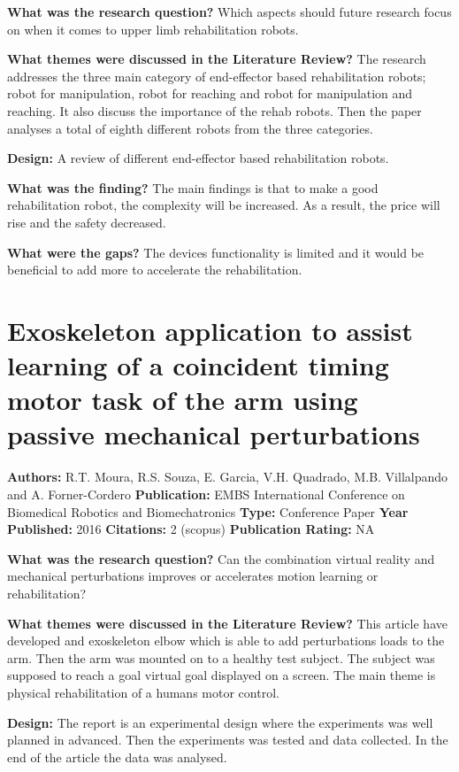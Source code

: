 \textbf{What was the research question?}
Which aspects should future research focus on when it comes to upper limb rehabilitation robots.

\textbf{What themes were discussed in the Literature Review?}  
The research addresses the three main category of end-effector based rehabilitation robots; robot for manipulation, robot for reaching and robot for manipulation and reaching. It also discuss the importance of the rehab robots. Then the paper analyses a total of eighth different robots from the three categories. 

\textbf{Design:}  
A review of different end-effector based rehabilitation robots. 

\textbf{What was the finding?} 
The main findings is that to make a good rehabilitation robot, the complexity will be increased. As a result, the price will rise and the safety decreased. 

\textbf{What were the gaps?}   
The devices functionality is limited and it would be beneficial to add more to accelerate the rehabilitation. 



\section{Exoskeleton application to assist learning of a coincident timing motor task of the arm using passive mechanical perturbations} 
\textbf{Authors:} R.T. Moura, R.S. Souza, E. Garcia, V.H. Quadrado, M.B. Villalpando and A. Forner-Cordero \newline
\textbf{Publication:} EMBS International Conference on Biomedical Robotics and Biomechatronics
\textbf{Type:} Conference Paper \newline
\textbf{Year Published:} 2016 
\textbf{Citations:} 2 (scopus)
\textbf{Publication Rating:} NA    

\textbf{What was the research question?} 
Can the combination virtual reality and mechanical perturbations improves or accelerates motion learning or rehabilitation? 

\textbf{What themes were discussed in the Literature Review?} 
This article have developed and exoskeleton elbow which is able to add perturbations loads to the arm. Then the arm was mounted on to a healthy test subject. The subject was supposed to reach a goal virtual goal displayed on a screen. The main theme is physical rehabilitation of a humans motor control. 

\textbf{Design:}  
The report is an experimental design where the experiments was well planned in advanced. Then the experiments was tested and data collected. In the end of the article the data was analysed. 

